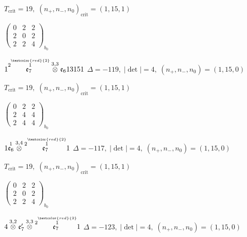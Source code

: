 \documentclass[10pt]{article}
\begin{document}
\hspace{1em}$T_{\text{crit}}=19,\; (n_+,n_-,n_0)_{\text{crit}}=(1,15,1)$

\hspace{2em}$\left(\begin{smallmatrix}0 & 2 & 2 \\ 2 & 0 & 2 \\ 2 & 2 & 4\end{smallmatrix}\right)_{\!b_0}$

\smallskip

$1\overset{2\overset{\textcolor{red}{2}}{1}}{\mathfrak{e}_7}\overset{3,3}{\otimes}\mathfrak{e}_613151$ \quad $\Delta=-119,\; |\det|=4,\; (n_+,n_-,n_0)=(1,15,0)$

\hspace{1em}$T_{\text{crit}}=19,\; (n_+,n_-,n_0)_{\text{crit}}=(1,15,1)$

\hspace{2em}$\left(\begin{smallmatrix}0 & 2 & 2 \\ 2 & 4 & 4 \\ 2 & 4 & 4\end{smallmatrix}\right)_{\!b_0}$

\smallskip

$1\overset{1}{\mathfrak{e}_6}\overset{3,4}{\otimes}\overset{2\overset{\textcolor{red}{2}}{1}}{\mathfrak{e}_7}1$ \quad $\Delta=-117,\; |\det|=4,\; (n_+,n_-,n_0)=(1,15,0)$

\hspace{1em}$T_{\text{crit}}=19,\; (n_+,n_-,n_0)_{\text{crit}}=(1,15,1)$

\hspace{2em}$\left(\begin{smallmatrix}0 & 2 & 2 \\ 2 & 0 & 2 \\ 2 & 2 & 4\end{smallmatrix}\right)_{\!b_0}$

\smallskip

$4\overset{3,2}{\otimes}\mathfrak{e}_7'\overset{3,3}{\otimes}\overset{2\overset{\textcolor{red}{2}}{1}}{\mathfrak{e}_7}1$ \quad $\Delta=-123,\; |\det|=4,\; (n_+,n_-,n_0)=(1,15,0)$
\end{document}
